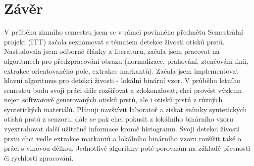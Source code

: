\chapter{Závěr}
V průběhu zimního semestru jsem se v rámci povinného předmětu Semestrální projekt (ITT) začala seznamovat s tématem detekce živosti otisků prstů. Nastudovala jsem odborné články a literaturu, začala jsem pracovat na algoritmech pro předzpracování obrazu (normalizace, prahování, ztenčování linií, extrakce orientovaného pole, extrakce markantů). Začala jsem implementovat hlavní algoritmus pro detekci živosti - lokální binární vzor. V průběhu letního semestru budu svoji práci dále rozšiřovat a zdokonalovat, chci provést výzkum nejen softwarově generovaných otisků prstů, ale i otisků prstů z různých syntetických materiálů. Plánuji navštívit laboratoř a získat snímky syntetických otisků prstů z senzoru, dále se pak chci pokusit z lokálního binárního vzoru vyextrahovat další užitečné informace kromě histogramu. Svoji detekci živosti prstu chci vedle extrakce markantů a lokálního binárního vzoru rozšířit také o práci s vlnovou délkou. Jednotlivé algoritmy poté porovnám na základě přesnosti či rychlosti zpracování. 

\label{zaver}


